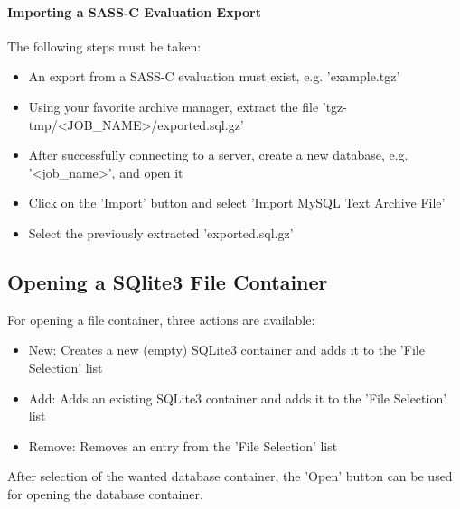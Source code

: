 \paragraph{Importing a SASS-C Evaluation Export}

The following steps must be taken:

\begin{itemize}  
\item An export from a SASS-C evaluation must exist, e.g. 'example.tgz'
\item Using your favorite archive manager, extract the file 'tgz-tmp/<JOB\_NAME>/exported.sql.gz'
\item After successfully connecting to a server, create a new database, e.g. '<job\_name>', and open it
\item Click on the 'Import' button and select 'Import MySQL Text Archive File'
\item Select the previously extracted 'exported.sql.gz'
\end{itemize}

\subsection{Opening a SQlite3 File Container}
\label{sec:sqlite_fc}
For opening a file container, three actions are available:

\begin{itemize}  
\item New: Creates a new (empty) SQLite3 container and adds it to the 'File Selection' list
\item Add: Adds an existing  SQLite3 container and adds it to the 'File Selection' list
\item Remove: Removes an entry from the 'File Selection' list
\end{itemize}

After selection of the wanted database container, the 'Open' button can be used for opening the database container.

